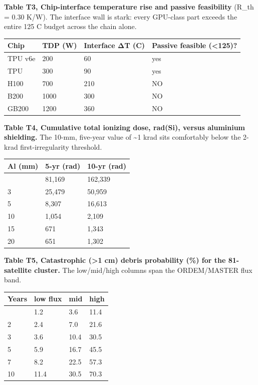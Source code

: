 \documentclass[
  11pt,
  openany,
  oneside]{book}
\newcounter{none} %
\begin{document}
\textbf{Table T3, Chip-interface temperature rise and passive
feasibility} (R\_th = 0.30 K/W). The interface wall is stark: every
GPU-class part exceeds the entire 125 C budget across the chain alone.

{\def\LTcaptype{none} %
\begin{longtable}[]{@{}llll@{}}
\toprule\noalign{}
Chip & TDP (W) & Interface ΔT (C) & Passive feasible (\textless125)? \\
\midrule\noalign{}
\endhead
\bottomrule\noalign{}
\endlastfoot
TPU v6e & 200 & 60 & yes \\
TPU & 300 & 90 & yes \\
H100 & 700 & 210 & NO \\
B200 & 1000 & 300 & NO \\
GB200 & 1200 & 360 & NO \\
\end{longtable}
}

\textbf{Table T4, Cumulative total ionizing dose, rad(Si), versus
aluminium shielding.} The 10-mm, five-year value of \textasciitilde1
krad sits comfortably below the 2-krad first-irregularity threshold.

{\def\LTcaptype{none} %
\begin{longtable}[]{@{}lll@{}}
\toprule\noalign{}
Al (mm) & 5-yr (rad) & 10-yr (rad) \\
\midrule\noalign{}
\endhead
\bottomrule\noalign{}
\endlastfoot
1 & 81,169 & 162,339 \\
3 & 25,479 & 50,959 \\
5 & 8,307 & 16,613 \\
10 & 1,054 & 2,109 \\
15 & 671 & 1,343 \\
20 & 651 & 1,302 \\
\end{longtable}
}

\textbf{Table T5, Catastrophic (\textgreater1 cm) debris probability
(\%) for the 81-satellite cluster.} The low/mid/high columns span the
ORDEM/MASTER flux band.

{\def\LTcaptype{none} %
\begin{longtable}[]{@{}llll@{}}
\toprule\noalign{}
Years & low flux & mid & high \\
\midrule\noalign{}
\endhead
\bottomrule\noalign{}
\endlastfoot
1 & 1.2 & 3.6 & 11.4 \\
2 & 2.4 & 7.0 & 21.6 \\
3 & 3.6 & 10.4 & 30.5 \\
5 & 5.9 & 16.7 & 45.5 \\
7 & 8.2 & 22.5 & 57.3 \\
10 & 11.4 & 30.5 & 70.3 \\
\end{longtable}
}
\end{document}
